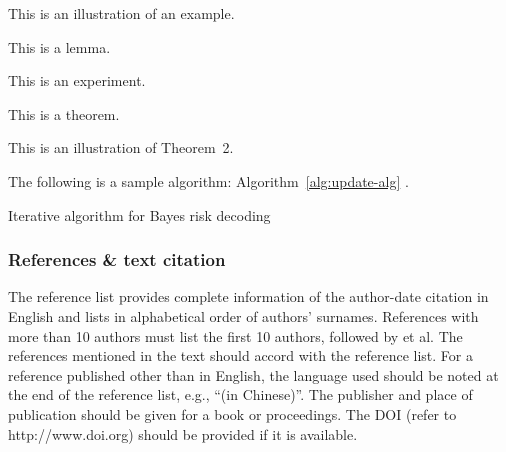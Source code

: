 \documentclass[twoside,twocolumn]{article}
\begin{document}
\begin{example}
This is an illustration of an example.
\end{example}

\begin{lemma}
This is a lemma.
\end{lemma}

\begin{experiment}
This is an experiment.
\end{experiment}

\begin{theorem}
This is a theorem.
\end{theorem}

\begin{theorem}
This is an illustration of Theorem~2.
\end{theorem}

The following is a sample algorithm: Algorithm~\ref{alg:update-alg} \citep{Xu11}.

\begin{algorithm}\small
\centering
\caption{Iterative algorithm for Bayes risk decoding} \label{alg:update-alg}
\begin{algorithmic}[1]
	\LOOP	
		\ENDFOR
		\ENDIF
	\ENDLOOP
\end{algorithmic}
\end{algorithm}	

\subsubsection{References \& text citation}

The reference list provides complete information of the author-date citation in English and lists in alphabetical order of authors' surnames.
References with more than 10 authors must list the first 10 authors, followed by {et al}. The references mentioned in the text should accord with the reference list. For a reference published other than in English, the language used should be noted at the end of the reference list, e.g., ``(in Chinese)''. The publisher and place of publication should be given for a book or proceedings. The DOI (refer to http://www.doi.org) should be provided if it is available.
\end{document}
